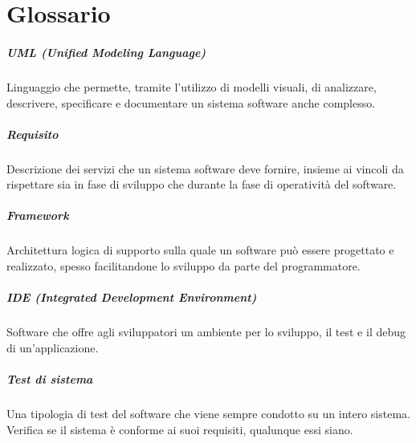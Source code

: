 \cleardoublepage
\chapter{Glossario}

\nocite{*}

\paragraph*{UML (Unified Modeling Language)} Linguaggio che permette, tramite l'utilizzo di modelli visuali, di analizzare, descrivere, specificare e documentare un sistema software anche complesso.
\label{para:uml-definition}

\paragraph*{Requisito} Descrizione dei servizi che un sistema software deve fornire, insieme ai vincoli da rispettare sia in fase di sviluppo che durante la fase di operatività del software.
\label{para:requisito-definition}

\paragraph*{Framework} Architettura logica di supporto sulla quale un software può essere progettato e realizzato, spesso facilitandone lo sviluppo da parte del programmatore.
\label{para:framework-definition}

\paragraph*{IDE (Integrated Development Environment)} Software che offre agli sviluppatori un ambiente per lo sviluppo, il test e il debug di un'applicazione.
\label{para:ide-definition}

\paragraph*{Test di sistema} Una tipologia di test del software che viene sempre condotto su un intero sistema. Verifica se il sistema è conforme ai suoi requisiti, qualunque essi siano.
\label{para:test-definition}